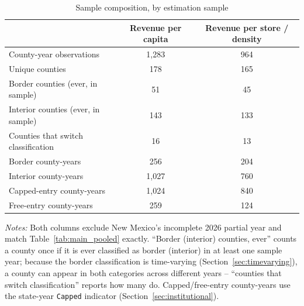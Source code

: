 \begin{table}[htbp]
\centering
\caption{Sample composition, by estimation sample}
\label{tab:sample_composition}
\begin{tabular}{lcc}
\toprule
 & Revenue per capita & Revenue per store / density \\
\midrule
County-year observations & 1,283 & 964 \\
Unique counties & 178 & 165 \\
\addlinespace
Border counties (ever, in sample) & 51 & 45 \\
Interior counties (ever, in sample) & 143 & 133 \\
Counties that switch classification & 16 & 13 \\
\addlinespace
Border county-years & 256 & 204 \\
Interior county-years & 1,027 & 760 \\
\addlinespace
Capped-entry county-years & 1,024 & 840 \\
Free-entry county-years & 259 & 124 \\
\bottomrule
\end{tabular}
\begin{minipage}{0.92\textwidth}
\vspace{0.3em}
\footnotesize
\textit{Notes:} Both columns exclude New Mexico's incomplete 2026 partial year and match
Table~\ref{tab:main_pooled} exactly. ``Border (interior) counties, ever'' counts a county once if it is
ever classified as border (interior) in at least one sample year; because the border classification is
time-varying (Section~\ref{sec:timevarying}), a county can appear in both categories across different
years -- ``counties that switch classification'' reports how many do. Capped/free-entry county-years use
the state-year \texttt{Capped} indicator (Section~\ref{sec:institutional}).
\end{minipage}
\end{table}

